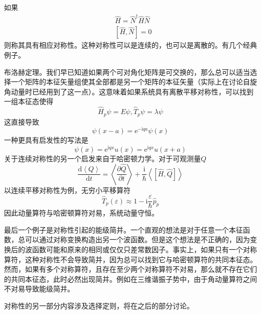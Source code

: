 \documentclass[12pt, a4paper, oneside]{ctexart}
\begin{document}
	\quad\quad 如果
	\begin{align}
		&\hat{H}=\hat{N}^{\dagger}\hat{H}\hat{N}\\
		&\left[\hat{H},\hat{N}\right]=0
	\end{align}
	\quad\quad 则称其具有相应对称性。这种对称性可以是连续的，也可以是离散的。有几个经典例子。\par 
	布洛赫定理。我们早已知道如果两个可对角化矩阵是可交换的，那么总可以适当选择一个矩阵的本征矢量组使其全部都是另一个矩阵的本征矢量（实际上在讨论自旋角动量时已经用到了这一点）。这意味着如果系统具有离散平移对称性，可以找到一组本征态使得
	\begin{equation}
		\hat{H}_{p}\psi=E\psi,\hat{T}_{p}\psi=\lambda\psi
	\end{equation}
	\quad\quad 这直接导致
	\begin{equation}
		\psi(x-a)=\mathrm{e}^{-\mathrm{i}qa}\psi(x)
	\end{equation}
	\quad\quad 一种更具有启发性的写法是
	\begin{equation}
		\psi(x)=\mathrm{e}^{\mathrm{i}qx}u(x)=\mathrm{e}^{\mathrm{i}qx}u(x+a)
	\end{equation}
	\quad\quad 关于连续对称性的另一个启发来自于哈密顿力学。对于可观测量$Q$
	\begin{equation}
		\dfrac{\mathrm{d}\left<Q\right>}{\mathrm{d}t}=\left<\dfrac{\partial\hat{Q}}{\partial t}\right>+\dfrac{\mathrm{i}}{\hbar}\left<\left[\hat{H},\hat{Q}\right]\right>
	\end{equation}
	\quad\quad 以连续平移对称性为例，无穷小平移算符
	\begin{equation}
		\hat{T}_{p}(\varepsilon)\approx1-\mathrm{i}\dfrac{\varepsilon}{\hbar}\hat{p}_{p}
	\end{equation}
	\quad\quad 因此动量算符与哈密顿算符对易，系统动量守恒。\par 
	最后一个例子是对称性引起的能级简并。一个直观的想法是对于任意一个本征函数，总可以通过对称变换构造出另一个波函数。但是这个想法是不正确的，因为变换后的波函数可能和原来的相同或仅仅只差常数因子。事实上，如果只有一个对称算符，这种对称性不会导致简并，因为总可以找到它与哈密顿算符的共同本征态。然而，如果有多个对称算符，且存在至少两个对称算符不对易，那么就不存在它们的共同本征态，此时必然出现简并。例如在三维谐振子势中，由于角动量算符之间不对易导致能级简并。\par 
	对称性的另一部分内容涉及选择定则，将在之后的部分讨论。
\end{document}
